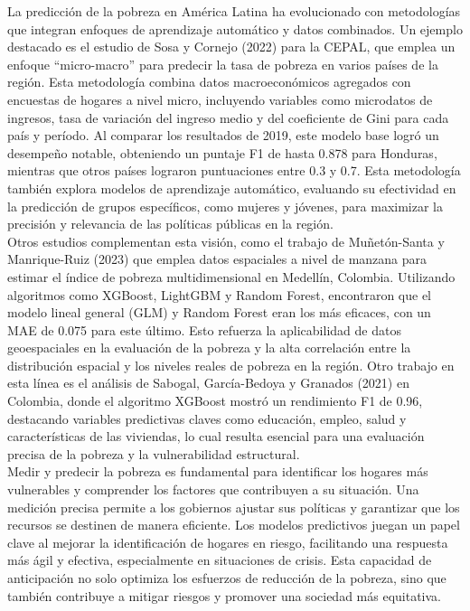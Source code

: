 \documentclass[a4paper]{article}
\theoremstyle{remark}
\theoremstyle{definition}
\begin{document}
La predicción de la pobreza en América Latina ha evolucionado con metodologías que integran enfoques de aprendizaje automático y datos combinados. Un ejemplo destacado es el estudio de Sosa y Cornejo (2022) para la CEPAL, que emplea un enfoque “micro-macro” para predecir la tasa de pobreza en varios países de la región. Esta metodología combina datos macroeconómicos agregados con encuestas de hogares a nivel micro, incluyendo variables como microdatos de ingresos, tasa de variación del ingreso medio y del coeficiente de Gini para cada país y período. Al comparar los resultados de 2019, este modelo base logró un desempeño notable, obteniendo un puntaje F1 de hasta 0.878 para Honduras, mientras que otros países lograron puntuaciones entre 0.3 y 0.7. Esta metodología también explora modelos de aprendizaje automático, evaluando su efectividad en la predicción de grupos específicos, como mujeres y jóvenes, para maximizar la precisión y relevancia de las políticas públicas en la región. \\

Otros estudios complementan esta visión, como el trabajo de Muñetón-Santa y Manrique-Ruiz (2023) que emplea datos espaciales a nivel de manzana para estimar el índice de pobreza multidimensional en Medellín, Colombia. Utilizando algoritmos como XGBoost, LightGBM y Random Forest, encontraron que el modelo lineal general (GLM) y Random Forest eran los más eficaces, con un MAE de 0.075 para este último. Esto refuerza la aplicabilidad de datos geoespaciales en la evaluación de la pobreza y la alta correlación entre la distribución espacial y los niveles reales de pobreza en la región. Otro trabajo en esta línea es el análisis de Sabogal, García-Bedoya y Granados (2021) en Colombia, donde el algoritmo XGBoost  mostró un rendimiento F1 de 0.96, destacando variables predictivas claves como educación, empleo, salud y características de las viviendas, lo cual resulta esencial para una evaluación precisa de la pobreza y la vulnerabilidad estructural. \\



Medir y predecir la pobreza es fundamental para identificar los hogares más vulnerables y comprender los factores que contribuyen a su situación. Una medición precisa permite a los gobiernos ajustar sus políticas y garantizar que los recursos se destinen de manera eficiente. Los modelos predictivos juegan un papel clave al mejorar la identificación de hogares en riesgo, facilitando una respuesta más ágil y efectiva, especialmente en situaciones de crisis. Esta capacidad de anticipación no solo optimiza los esfuerzos de reducción de la pobreza, sino que también contribuye a mitigar riesgos y promover una sociedad más equitativa.\\
\end{document}
